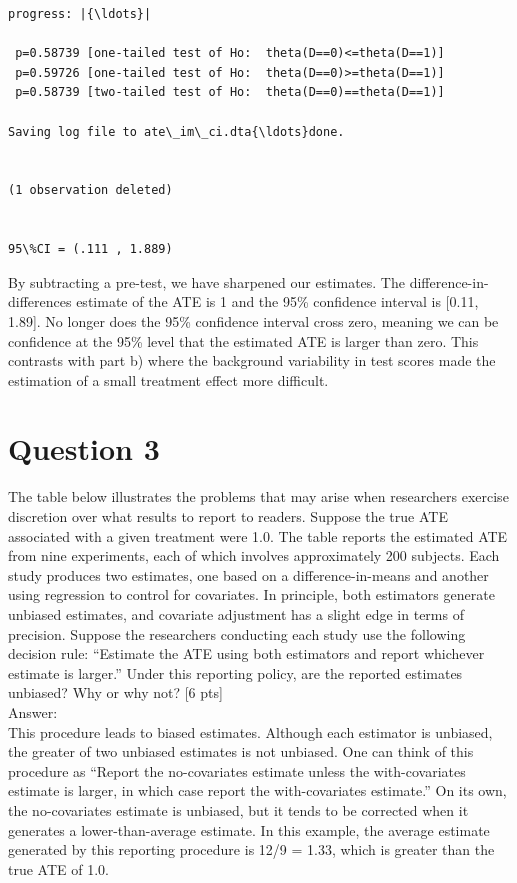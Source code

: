 \documentclass[11pt,notitlepage]{article}\usepackage[]{graphicx}\usepackage[]{color}
\makeatletter
\newenvironment{kframe}{%
 \def\at@end@of@kframe{}%
 \ifinner\ifhmode%
  \def\at@end@of@kframe{\end{minipage}}%
  \begin{minipage}{\columnwidth}%
 \fi\fi%
 \def\FrameCommand##1{\hskip\@totalleftmargin \hskip-\fboxsep
 \colorbox{shadecolor}{##1}\hskip-\fboxsep
     \hskip-\linewidth \hskip-\@totalleftmargin \hskip\columnwidth}%
 \MakeFramed {\advance\hsize-\width
   \@totalleftmargin\z@ \linewidth\hsize
   \@setminipage}}%
 {\par\unskip\endMakeFramed%
 \at@end@of@kframe}
\newenvironment{knitrout}{}{} %
\makeatother
\begin{document}
\begin{enumerate}[a)]
\begin{knitrout}
\begin{kframe}
\begin{Verbatim}[commandchars=\\\{\}]
progress: |{\ldots}|

 p=0.58739 [one-tailed test of Ho:  theta(D==0)<=theta(D==1)]
 p=0.59726 [one-tailed test of Ho:  theta(D==0)>=theta(D==1)]
 p=0.58739 [two-tailed test of Ho:  theta(D==0)==theta(D==1)]

Saving log file to ate\_im\_ci.dta{\ldots}done.


(1 observation deleted)


95\%CI = (.111 , 1.889)

    \end{Verbatim}

\end{kframe}
\end{knitrout}

By subtracting a pre-test, we have sharpened our estimates.  The difference-in-differences estimate of the ATE is 1 and the 95\% confidence interval is [0.11, 1.89].  No longer does the 95\% confidence interval cross zero, meaning we can be confidence at the 95\% level that the estimated ATE is larger than zero. This contrasts with part b) where the background variability in test scores made the estimation of a small treatment effect more difficult.

\end{enumerate}

\section*{Question 3}
The table below illustrates the problems that may arise when researchers exercise discretion over what results to report to readers. Suppose the true ATE associated with a given treatment were 1.0. The table reports the estimated ATE from nine experiments, each of which involves approximately 200 subjects. Each study produces two estimates, one based on a difference-in-means and another using regression to control for covariates. In principle, both estimators generate unbiased estimates, and covariate adjustment has a slight edge in terms of precision. Suppose the researchers conducting each study use the following decision rule: ``Estimate the ATE using both estimators and report whichever estimate is larger.'' Under this reporting policy, are the reported estimates unbiased? Why or why not? [6 pts]\\
Answer:\\
This procedure leads to biased estimates. Although each estimator is unbiased, the greater of two unbiased estimates is not unbiased. One can think of this procedure as ``Report the no-covariates estimate unless the with-covariates estimate is larger, in which case report the with-covariates estimate.'' On its own, the no-covariates estimate is unbiased, but it tends to be corrected when it generates a lower-than-average estimate. In this example, the average estimate generated by this reporting procedure is 12/9 = 1.33, which is greater than the true ATE of 1.0.
\end{document}
